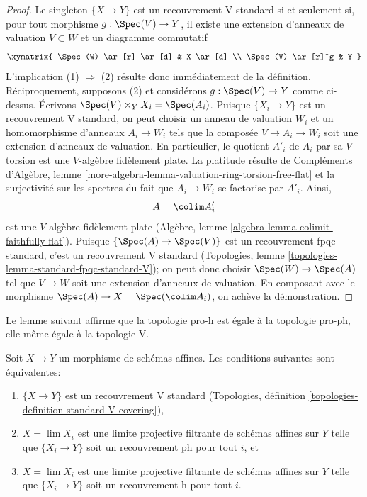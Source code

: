 \begin{proof}
Le singleton $\{X \to Y\}$ est un recouvrement V standard si et seulement si,
pour tout morphisme $g : \Spec(V) \to Y$, il existe une extension
d'anneaux de valuation $V \subset W$ et un diagramme commutatif
$$
\xymatrix{
\Spec(W) \ar[r] \ar[d] & X \ar[d] \\
\Spec(V) \ar[r]^g & Y
}
$$
L'implication (1) $\Rightarrow$ (2) résulte donc immédiatement de la définition.
Réciproquement, supposons (2) et considérons $g : \Spec(V) \to Y$ comme ci-dessus.
Écrivons $\Spec(V) \times_Y X_i = \Spec(A_i)$.
Puisque $\{X_i \to Y\}$ est un recouvrement V standard, on peut choisir
un anneau de valuation $W_i$ et un homomorphisme d'anneaux $A_i \to W_i$ tels que
la composée $V \to A_i \to W_i$ soit une extension d'anneaux de
valuation. En particulier, le quotient $A'_i$ de $A_i$ par sa
$V$-torsion est une $V$-algèbre fidèlement plate. La platitude résulte de
Compléments d'Algèbre, lemme
\ref{more-algebra-lemma-valuation-ring-torsion-free-flat} et
la surjectivité sur les spectres du fait que $A_i \to W_i$ se factorise par $A'_i$.
Ainsi,
$$
A = \colim A'_i
$$
est une $V$-algèbre fidèlement plate
(Algèbre, lemme \ref{algebra-lemma-colimit-faithfully-flat}).
Puisque $\{\Spec(A) \to \Spec(V)\}$ est un recouvrement fpqc standard, c'est
un recouvrement V standard
(Topologies, lemme \ref{topologies-lemma-standard-fpqc-standard-V});
on peut donc choisir $\Spec(W) \to \Spec(A)$ tel que
$V \to W$ soit une extension d'anneaux de valuation. En composant
avec le morphisme $\Spec(A) \to X = \Spec(\colim A_i)$,
on achève la démonstration.
\end{proof}

\noindent
Le lemme suivant affirme que la topologie pro-h est égale à la
topologie pro-ph, elle-même égale à la topologie V.

\begin{lemma}
\label{lemma-pro-h-V}
Soit $X \to Y$ un morphisme de schémas affines. Les conditions suivantes sont équivalentes:
\begin{enumerate}
\item $\{X \to Y\}$ est un recouvrement V standard
(Topologies, définition \ref{topologies-definition-standard-V-covering}),
\item $X = \lim X_i$ est une limite projective filtrante de schémas affines sur $Y$
telle que $\{X_i \to Y\}$ soit un recouvrement ph pour tout $i$, et
\item $X = \lim X_i$ est une limite projective filtrante de schémas affines sur $Y$
telle que $\{X_i \to Y\}$ soit un recouvrement h pour tout $i$.
\end{enumerate}
\end{lemma}

